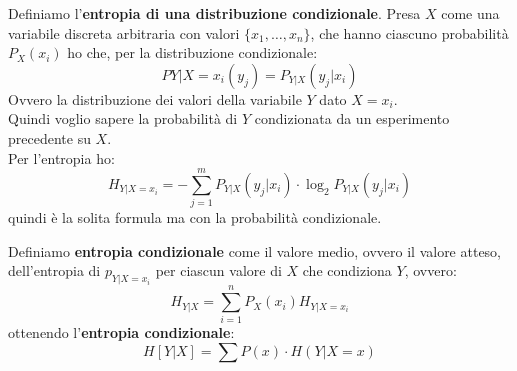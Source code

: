 \begin{definizione}
  Definiamo l'\textbf{entropia di una distribuzione condizionale}. Presa $X$
  come una variabile discreta arbitraria con valori $\{x_1,\ldots, x_n\}$, che
  hanno ciascuno probabilità $P_X(x_i)$ ho che, per la distribuzione
  condizionale:
  \[P{Y|X=x_i}(y_j)=P_{Y|X}(y_j|x_i)\]
  Ovvero la distribuzione dei valori della variabile $Y$ dato $X=x_i$.\\
  Quindi voglio sapere la probabilità di $Y$ condizionata da un esperimento
  precedente su $X$.\\
  Per l'entropia ho:
  \[H_{Y|X=x_i}=-\sum_{j=1}^m P_{Y|X}(y_j|x_i)\cdot \log_2 P_{Y|X}(y_j|x_i)\]
  quindi è la solita formula ma con la probabilità condizionale.
\end{definizione}
\begin{definizione}
  Definiamo \textbf{entropia condizionale} come il valore medio, ovvero il
  valore atteso, dell'entropia di $p_{Y|X=x_i}$ per ciascun valore di $X$ che
  condiziona $Y$, ovvero:
  \[H_{Y|X}=\sum_{i=1}^n P_X(x_i)H_{Y|X=x_i}\]
  ottenendo l'\textbf{entropia condizionale}:
  \[H[Y|X]=\sum P(x)\cdot H(Y|X=x)\]
\end{definizione}
